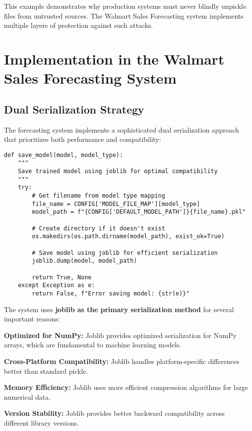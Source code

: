 This example demonstrates why production systems must never blindly unpickle files from untrusted sources. The Walmart Sales Forecasting system implements multiple layers of protection against such attacks.

\section{Implementation in the Walmart Sales Forecasting System}

\subsection{Dual Serialization Strategy}

The forecasting system implements a sophisticated dual serialization approach that prioritizes both performance and compatibility:

\begin{lstlisting}[language=MyPython, caption={Model Saving with Joblib Primary Strategy}]
def save_model(model, model_type):
    """
    Save trained model using joblib for optimal compatibility
    """
    try:
        # Get filename from model type mapping
        file_name = CONFIG['MODEL_FILE_MAP'][model_type]
        model_path = f"{CONFIG['DEFAULT_MODEL_PATH']}{file_name}.pkl"
        
        # Create directory if it doesn't exist
        os.makedirs(os.path.dirname(model_path), exist_ok=True)
        
        # Save model using joblib for efficient serialization
        joblib.dump(model, model_path)
        
        return True, None
    except Exception as e:
        return False, f"Error saving model: {str(e)}"
\end{lstlisting}

The system uses \textbf{joblib as the primary serialization method} for several important reasons:

\textbf{Optimized for NumPy:} Joblib provides optimized serialization for NumPy arrays, which are fundamental to machine learning models.

\textbf{Cross-Platform Compatibility:} Joblib handles platform-specific differences better than standard pickle.

\textbf{Memory Efficiency:} Joblib uses more efficient compression algorithms for large numerical data.

\textbf{Version Stability:} Joblib provides better backward compatibility across different library versions.

